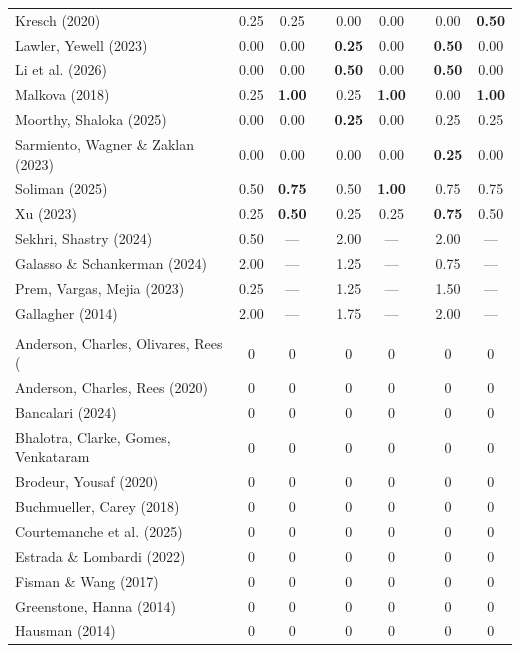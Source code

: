 \begin{table}[htbp]
\begin{tabular}{@{}lcccccccc@{}}
Kresch (2020) & 0.25 & 0.25 & & 0.00 & 0.00 & & 0.00 & \textbf{0.50} \\
Lawler, Yewell (2023) & 0.00 & 0.00 & & \textbf{0.25} & 0.00 & & \textbf{0.50} & 0.00 \\
Li et al. (2026) & 0.00 & 0.00 & & \textbf{0.50} & 0.00 & & \textbf{0.50} & 0.00 \\
Malkova (2018) & 0.25 & \textbf{1.00} & & 0.25 & \textbf{1.00} & & 0.00 & \textbf{1.00} \\
Moorthy, Shaloka (2025) & 0.00 & 0.00 & & \textbf{0.25} & 0.00 & & 0.25 & 0.25 \\
Sarmiento, Wagner \& Zaklan (2023) & 0.00 & 0.00 & & 0.00 & 0.00 & & \textbf{0.25} & 0.00 \\
Soliman (2025) & 0.50 & \textbf{0.75} & & 0.50 & \textbf{1.00} & & 0.75 & 0.75 \\
Xu (2023) & 0.25 & \textbf{0.50} & & 0.25 & 0.25 & & \textbf{0.75} & 0.50 \\
Sekhri, Shastry (2024) & 0.50 & --- & & 2.00 & --- & & 2.00 & --- \\
Galasso \& Schankerman (2024) & 2.00 & --- & & 1.25 & --- & & 0.75 & --- \\
Prem, Vargas, Mejia (2023) & 0.25 & --- & & 1.25 & --- & & 1.50 & --- \\
Gallagher (2014) & 2.00 & --- & & 1.75 & --- & & 2.00 & --- \\
\addlinespace[6pt]
\multicolumn{9}{l}{\textit{Panel B: Neither significant at any $\bar{M}$}} \\
\addlinespace[3pt]
Anderson, Charles, Olivares, Rees ( & 0 & 0 & & 0 & 0 & & 0 & 0 \\
Anderson, Charles, Rees (2020) & 0 & 0 & & 0 & 0 & & 0 & 0 \\
Bancalari (2024) & 0 & 0 & & 0 & 0 & & 0 & 0 \\
Bhalotra, Clarke, Gomes, Venkataram & 0 & 0 & & 0 & 0 & & 0 & 0 \\
Brodeur, Yousaf (2020) & 0 & 0 & & 0 & 0 & & 0 & 0 \\
Buchmueller, Carey (2018) & 0 & 0 & & 0 & 0 & & 0 & 0 \\
Courtemanche et al. (2025) & 0 & 0 & & 0 & 0 & & 0 & 0 \\
Estrada \& Lombardi (2022) & 0 & 0 & & 0 & 0 & & 0 & 0 \\
Fisman \& Wang (2017) & 0 & 0 & & 0 & 0 & & 0 & 0 \\
Greenstone, Hanna (2014) & 0 & 0 & & 0 & 0 & & 0 & 0 \\
Hausman (2014) & 0 & 0 & & 0 & 0 & & 0 & 0 \\

\end{tabular}
\end{table}
